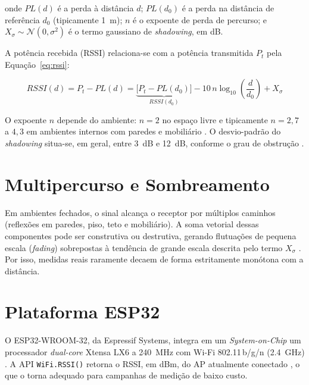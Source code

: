 \documentclass[
  12pt,
  a4paper,
  oneside,
  brazil,
  chapter=TITLE,
  section=TITLE,
]{abntex2}
\begin{document}
\noindent onde $PL(d)$ \'e a perda \`a dist\^ancia $d$; $PL(d_0)$ \'e a perda na
dist\^ancia de refer\^encia $d_0$ (tipicamente \SI{1}{\meter}); $n$ \'e o
expoente de perda de percurso; e $X_\sigma \sim \mathcal{N}(0,\sigma^2)$ \'e o
termo gaussiano de \textit{shadowing}, em dB.

A pot\^encia recebida (RSSI) relaciona-se com a pot\^encia transmitida $P_t$
pela Equa\c{c}\~ao~\ref{eq:rssi}:

\begin{equation}
  RSSI(d) = P_t - PL(d) = \underbrace{\big[P_t - PL(d_0)\big]}_{RSSI(d_0)}
            - 10\,n\log_{10}\!\left(\frac{d}{d_0}\right) + X_\sigma
  \label{eq:rssi}
\end{equation}

O expoente $n$ depende do ambiente: $n = 2$ no espa\c{c}o livre e tipicamente
$n = 2{,}7$ a $4{,}3$ em ambientes internos com paredes e mobili\'ario
\cite{rappaport2002}. O desvio-padr\~ao do \textit{shadowing} situa-se, em geral,
entre \SI{3}{dB} e \SI{12}{dB}, conforme o grau de obstru\c{c}\~ao
\cite{goldsmith2005,molisch2011}.

\section{Multipercurso e Sombreamento}

Em ambientes fechados, o sinal alcan\c{c}a o receptor por m\'ultiplos caminhos
(reflex\~oes em paredes, piso, teto e mobili\'ario). A soma vetorial dessas
componentes pode ser construtiva ou destrutiva, gerando flutua\c{c}\~oes de
pequena escala (\textit{fading}) sobrepostas \`a tend\^encia de grande escala
descrita pelo termo $X_\sigma$ \cite{molisch2011}. Por isso, medidas reais
raramente decaem de forma estritamente mon\'otona com a dist\^ancia.

\section{Plataforma ESP32}

O ESP32-WROOM-32, da Espressif Systems, integra em um \textit{System-on-Chip}
um processador \textit{dual-core} Xtensa LX6 a \SI{240}{\mega\hertz} com Wi-Fi
802.11\,b/g/n (\SI{2.4}{\giga\hertz}) \cite{esp32datasheet2023}. A API
\texttt{WiFi.RSSI()} retorna o RSSI, em dBm, do AP atualmente conectado
\cite{espressifwifi2023}, o que o torna adequado para campanhas de medi\c{c}\~ao
de baixo custo.

\end{document}
